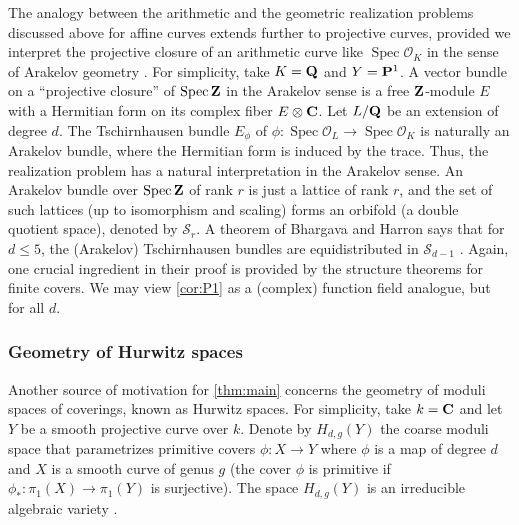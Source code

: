 \documentclass[11 pt]{amsart}
\renewcommand{\k}{k}
\renewcommand{\O}{{\mathcal O}}
\providecommand {\Z}{{\bf Z}}
\providecommand {\Q}{{\bf Q}}
\providecommand {\C}{{\bf C}}
\renewcommand {\P}{{\bf P}}
\providecommand {\from}{{\colon}}
\providecommand{\spec}{\operatorname{Spec}}
\numberwithin{equation}{section}
\begin{document}
The analogy between the arithmetic and the geometric realization problems discussed above for affine curves extends further to projective curves, provided we interpret the projective closure of an arithmetic curve like $\spec \O_K$ in the sense of Arakelov geometry \cite{sou:92}.
For simplicity, take $K = \Q$ and $Y = \P^1$.
A vector bundle on a ``projective closure'' of $\spec \Z$ in the Arakelov sense is a free $\Z$-module $E$ with a Hermitian form on its complex fiber $E \otimes \C$.
Let $L/\Q$ be an extension of degree $d$.
The Tschirnhausen bundle $E_\phi$ of $\phi \from \spec \O_L \to \spec \O_K$ is naturally an Arakelov bundle, where the Hermitian form is induced by the trace.
Thus, the realization problem has a natural interpretation in the Arakelov sense.
An Arakelov bundle over $\spec \Z$ of rank $r$ is just a lattice of rank $r$, and the set of such lattices (up to isomorphism and scaling) forms an orbifold (a double quotient space), denoted by $\mathcal S_r$.
A theorem of Bhargava and Harron says that for $d \leq 5$, the (Arakelov) Tschirnhausen bundles are equidistributed in $\mathcal S_{d-1}$ \cite[Theorem~1]{bha.har:16}.
Again, one crucial ingredient in their proof is provided by the structure theorems for finite covers.
We may view \autoref{cor:P1} as a (complex) function field analogue, but for all $d$.



\subsubsection{Geometry of Hurwitz spaces}
Another source of motivation for \autoref{thm:main} concerns the geometry of moduli spaces of coverings, known as Hurwitz spaces.
For simplicity, take $\k = \C$ and let $Y$ be a smooth projective curve over $\k$.
Denote by $H_{d,g}(Y)$ the coarse moduli space that parametrizes primitive covers $\phi \from X \to Y$ where $\phi$ is a map of degree $d$ and $X$ is a smooth curve of genus $g$ (the cover $\phi$ is primitive if $\phi_* \from \pi_1(X) \to \pi_1(Y)$ is surjective).
The space $H_{d,g}(Y)$ is an irreducible algebraic variety \cite[Theorem~9.2]{gab.kaz:87}.
\end{document}
